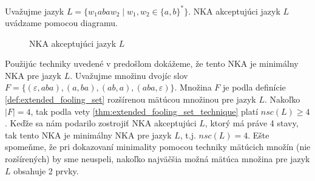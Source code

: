 \begin{example}
\normalfont Uvažujme jazyk $ L = \lbrace w_1abaw_2 \; | \; w_1,w_2 \in \lbrace a,b \rbrace^* \rbrace $. NKA akceptujúci jazyk $ L $ uvádzame pomocou diagramu.

\begin{figure}[H]
\centering
{}

\caption{NKA akceptujúci jazyk $ L $}
\end{figure}
Použijúc techniky uvedené v predošlom dokážeme, že tento NKA je minimálny NKA pre jazyk $ L $. Uvažujme množinu dvojíc slov $ F = \lbrace (\varepsilon, aba), (a,ba), (ab,a),(aba,\varepsilon) \rbrace $. Množina $ F $ je podla definície \ref{def:extended_fooling_set} rozšírenou mätúcou množinou pre jazyk $ L $.  Nakoľko $ |F| = 4 $, tak podla vety \ref{thm:extended_fooling_set_technique} platí $ nsc(L) \geq 4 $. Keďže sa nám podarilo zostrojiť NKA akceptujúci $ L $, ktorý má práve 4 stavy, tak tento NKA je minimálny NKA pre jazyk $ L $, t.j. $ nsc(L) = 4 $. Ešte spomeňme, že pri dokazovaní minimality pomocou techniky mätúcich množín (nie rozšírených) by sme neuspeli, nakoľko najväčšia možná mätúca množina pre jazyk $ L $ obsahuje 2 prvky.
\end{example}

